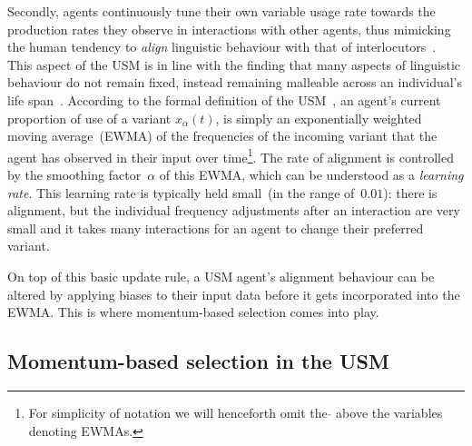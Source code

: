 \documentclass[10pt]{article}
\begin{document}
Secondly, agents continuously tune their own variable usage rate towards the production rates they observe in interactions with other agents, thus mimicking the human tendency to \emph{align} linguistic behaviour with that of interlocutors~\citep{Giles1991,Branigan2000,Jaeger2013}. This aspect of the USM is in line with the finding that many aspects of linguistic behaviour do not remain fixed, instead remaining malleable across an individual's life span~\citep{Kerswill1996,Sankoff2007,LCAS2009,Bowie2013,Stanford2014handbook}. According to the formal definition of the USM~\citep{Baxter2006}, an agent's current proportion of use of a variant $x_\alpha(t)$, is simply an exponentially weighted moving average~(EWMA) of the frequencies of the incoming variant that the agent has observed in their input over time\footnote{For simplicity of notation we will henceforth omit the $\hat{}$ above the variables denoting EWMAs.}. The rate of alignment is controlled by the smoothing factor~$\alpha$ of this EWMA, which can be understood as a \emph{learning rate}. This learning rate is typically held small~(in the range of~$0.01$): there is alignment, but the individual frequency adjustments after an interaction are very small and it takes many interactions for an agent to change their preferred variant.

On top of this basic update rule, a USM agent's alignment behaviour can be altered by applying biases to their input data before it gets incorporated into the EWMA. This is where momentum-based selection comes into play.

\subsection{Momentum-based selection in the USM}
\end{document}

